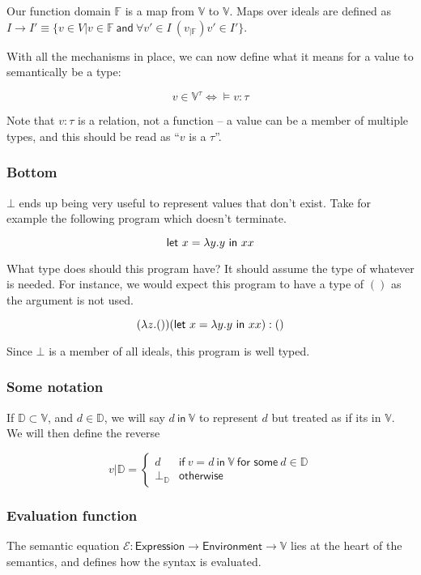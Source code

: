 Our function domain $\mathbb{F}$ is a map from $\mathbb{V}$ to
$\mathbb{V}$. Maps over ideals are defined as
$I \rightarrow I' \equiv \{ v \in V | v \in \mathbb{F} \ \mathsf{and} \ \forall v' \in I \
(v_{|\mathbb{F}})v' \in I' \}$.

With all the mechanisms in place, we can now define what it means for
a value to semantically be a type:

$$v \in \mathbb{V}^\tau \iff \vDash v : \tau$$

Note that $v : \tau$ is a relation, not a function -- a value can be a
member of multiple types, and this should be read as ``$v$ is a $\tau$''.

\subsubsection{Bottom}
$\bot$ ends up being very useful to represent values that don't exist.
Take for example the following program which doesn't terminate. 

$$\mathsf{let} \ x = \lambda y. y \ \mathsf{in} \ x x$$

What type does should this program have? It should assume the
type of whatever is needed. For instance, we would expect this program
to have a type of $()$ as the argument is not used.

$$(\lambda z. ()) (\mathsf{let} \ x = \lambda y. y \ \mathsf{in} \ x x) : ()$$

Since $\bot$ is a member of all ideals, this program is well typed.

\subsubsection{Some notation}

If $\mathbb{D} \subset \mathbb{V}$, and $d \in \mathbb{D}$, we will say $d \ \mathsf{in} \
\mathbb{V}$ to represent $d$ but treated as if its in $\mathbb{V}$. \\
We will then define the reverse

$$v | \mathbb{D} =
\begin{cases}
  d & \textsf{if} \ v = d \ \textsf{in} \ \mathbb{V} \ \textsf{for
    some} \ d \in \mathbb{D} \\
  \bot_{\mathbb{D}} & \textsf{otherwise}
\end{cases}
$$


\subsubsection{Evaluation function}
The semantic equation $\mathcal{E} : \mathsf{Expression} \rightarrow
\mathsf{Environment} \rightarrow \mathbb{V}$ lies at the heart of the semantics,
and defines how the syntax is evaluated.

